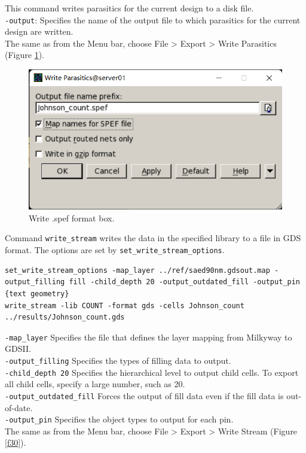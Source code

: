 \documentclass[a4paper,12pt,twoside]{article}
\begin{document}
\begin{enumerate}
    This command writes parasitics for the current design to a disk file.\\
    \texttt{-output}: Specifies the name of the output file to which parasitics for the current design are written.\\
    The same as from the Menu bar, choose File > Export > Write Parasitics (Figure \ref{f29}).
    \begin{figure}[H]
        \centering
        \includegraphics[width=\textwidth]{images/29.png}
        \caption{Write .spef format box.}
        \label{f29}
    \end{figure}
    Command \texttt{write\_stream} writes the data in the specified library to a file in GDS format. The options are set by \texttt{set\_write\_stream\_options}.
    \begin{verbatim}
set_write_stream_options -map_layer ../ref/saed90nm.gdsout.map -output_filling fill	-child_depth 20	-output_outdated_fill -output_pin {text geometry}
write_stream -lib COUNT -format gds -cells Johnson_count ../results/Johnson_count.gds
    \end{verbatim}
    \texttt{-map\_layer} Specifies the file that defines the layer mapping from Milkyway to GDSII.\\
    \texttt{-output\_filling} Specifies the types of filling data to output.\\
    \texttt{-child\_depth 20} Specifies the hierarchical level to output child cells. To export all child cells, specify a large number, such as 20.\\
    \texttt{-output\_outdated\_fill} Forces the output of fill data even if the fill data is out-of-date.\\
    \texttt{-output\_pin} Specifies the object types to output for each pin.\\
    The same as from the Menu bar, choose File > Export > Write Stream (Figure \ref{f30}).

\end{enumerate}
\end{document}
